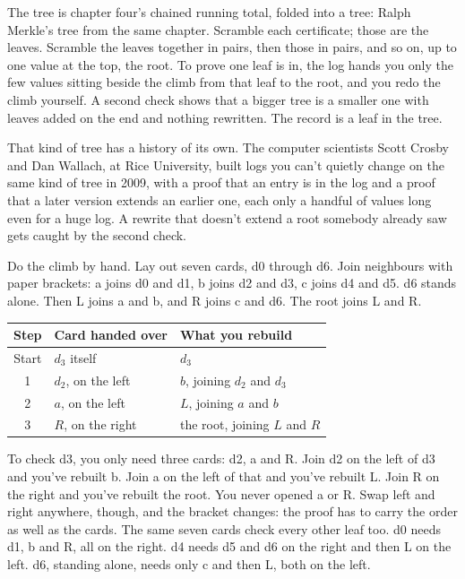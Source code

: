 \documentclass[11pt,twoside]{article}
\theoremstyle{thielethm}
\theoremstyle{thieledef}
\theoremstyle{thieledef}
\theoremstyle{thieledef}
\theoremstyle{thielethm}
\theoremstyle{thieleobs}
\theoremstyle{thielethm}
\begin{document}
The tree is chapter four's chained running total, folded into a tree: Ralph Merkle's tree from the same chapter. Scramble each certificate; those are the leaves. Scramble the leaves together in pairs, then those in pairs, and so on, up to one value at the top, the root. To prove one leaf is in, the log hands you only the few values sitting beside the climb from that leaf to the root, and you redo the climb yourself. A second check shows that a bigger tree is a smaller one with leaves added on the end and nothing rewritten. The record is a leaf in the tree.

That kind of tree has a history of its own. The computer scientists Scott Crosby and Dan Wallach, at Rice University, built logs you can't quietly change on the same kind of tree in 2009, with a proof that an entry is in the log and a proof that a later version extends an earlier one, each only a handful of values long even for a huge log. A rewrite that doesn't extend a root somebody already saw gets caught by the second check.

Do the climb by hand. Lay out seven cards, d0 through d6. Join neighbours with paper brackets: a joins d0 and d1, b joins d2 and d3, c joins d4 and d5. d6 stands alone. Then L joins a and b, and R joins c and d6. The root joins L and R.

\begin{center}
\small
\begin{tabular}{@{}cll@{}}
Step & Card handed over & What you rebuild \\ \hline
Start & $d_3$ itself & $d_3$ \\
1 & $d_2$, on the left & $b$, joining $d_2$ and $d_3$ \\
2 & $a$, on the left & $L$, joining $a$ and $b$ \\
3 & $R$, on the right & the root, joining $L$ and $R$ \\ \hline
\end{tabular}
\end{center}

To check d3, you only need three cards: d2, a and R. Join d2 on the left of d3 and you've rebuilt b. Join a on the left of that and you've rebuilt L. Join R on the right and you've rebuilt the root. You never opened a or R. Swap left and right anywhere, though, and the bracket changes: the proof has to carry the order as well as the cards. The same seven cards check every other leaf too. d0 needs d1, b and R, all on the right. d4 needs d5 and d6 on the right and then L on the left. d6, standing alone, needs only c and then L, both on the left.
\end{document}
